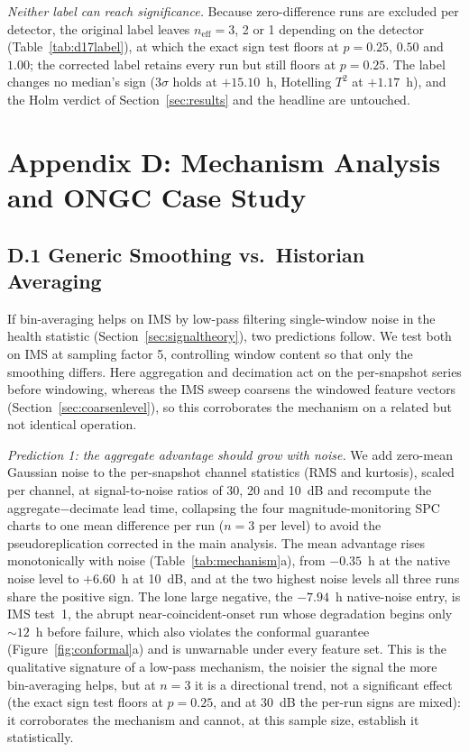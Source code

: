 \documentclass[IJPHM, 2026, 0]{PHMSociety}
\begin{document}
\emph{Neither label can reach significance.} Because zero-difference runs are excluded per detector, the original label leaves $n_{\text{eff}}=3$, 2 or 1 depending on the detector (Table~\ref{tab:d17label}), at which the exact sign test floors at $p=0.25$, $0.50$ and $1.00$; the corrected label retains every run but still floors at $p=0.25$. The label changes no median's sign ($3\sigma$ holds at $+15.10$~h, Hotelling $T^2$ at $+1.17$~h), and the Holm verdict of Section~\ref{sec:results} and the headline are untouched.

\section*{Appendix D: Mechanism Analysis and ONGC Case Study}

\subsection*{D.1 Generic Smoothing vs.\ Historian Averaging}


If bin-averaging helps on IMS by low-pass filtering single-window noise in the health statistic (Section~\ref{sec:signaltheory}), two predictions follow. We test both on IMS at sampling factor 5, controlling window content so that only the smoothing differs. Here aggregation and decimation act on the per-snapshot series before windowing, whereas the IMS sweep coarsens the windowed feature vectors (Section~\ref{sec:coarsenlevel}), so this corroborates the mechanism on a related but not identical operation.

\emph{Prediction 1: the aggregate advantage should grow with noise.} We add zero-mean Gaussian noise to the per-snapshot channel statistics (RMS and kurtosis), scaled per channel, at signal-to-noise ratios of 30, 20 and 10~dB and recompute the aggregate$-$decimate lead time, collapsing the four magnitude-monitoring SPC charts to one mean difference per run ($n=3$ per level) to avoid the pseudoreplication corrected in the main analysis. The mean advantage rises monotonically with noise (Table~\ref{tab:mechanism}a), from $-0.35$~h at the native noise level to $+6.60$~h at 10~dB, and at the two highest noise levels all three runs share the positive sign. The lone large negative, the $-7.94$~h native-noise entry, is IMS test~1, the abrupt near-coincident-onset run whose degradation begins only ${\sim}12$~h before failure, which also violates the conformal guarantee (Figure~\ref{fig:conformal}a) and is unwarnable under every feature set. This is the qualitative signature of a low-pass mechanism, the noisier the signal the more bin-averaging helps, but at $n=3$ it is a directional trend, not a significant effect (the exact sign test floors at $p=0.25$, and at 30~dB the per-run signs are mixed): it corroborates the mechanism and cannot, at this sample size, establish it statistically.
\end{document}
